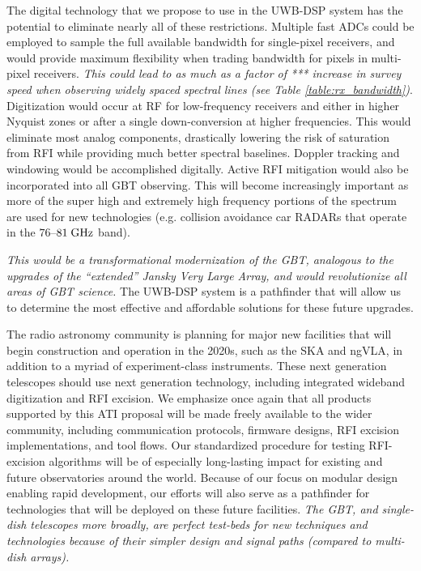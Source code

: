 \documentclass[10pt]{myNSF}
\begin{document}
The digital technology that we propose to use in the UWB-DSP system
has the potential to eliminate nearly all of these restrictions.
Multiple fast ADCs could be employed to sample the full available
bandwidth for single-pixel receivers, and would provide maximum
flexibility when trading bandwidth for pixels in multi-pixel
receivers.  \emph{This could lead to as much as a factor of ***
  increase in survey speed when observing widely spaced spectral lines
  (see Table \ref{table:rx_bandwidth})}.  Digitization would occur at
RF for low-frequency receivers and either in higher Nyquist zones or
after a single down-conversion at higher frequencies.  This would
eliminate most analog components, drastically lowering the risk of
saturation from RFI while providing much better spectral baselines.
Doppler tracking and windowing would be accomplished digitally.
Active RFI mitigation would also be incorporated into all GBT
observing.  This will become increasingly important as more of the
super high and extremely high frequency portions of the spectrum are
used for new technologies (e.g. collision avoidance car RADARs that
operate in the $76$--$81\; \textrm{GHz}$ band).

\emph{This would be a transformational modernization of
  the GBT, analogous to the upgrades of the ``extended'' Jansky Very
  Large Array, and would revolutionize all areas of GBT science.}  The
UWB-DSP system is a pathfinder that will allow us to determine the
most effective and affordable solutions for these future upgrades.


The radio astronomy community is planning for major new facilities
that will begin construction and operation in the 2020s, such as the
SKA and ngVLA, in addition to a myriad of experiment-class
instruments.  These next generation telescopes should use next
generation technology, including integrated wideband digitization and
RFI excision.  We emphasize once again that all products supported by
this ATI proposal will be made freely available to the wider
community, including communication protocols, firmware designs, RFI
excision implementations, and tool flows.  Our standardized procedure
for testing RFI-excision algorithms will be of especially long-lasting
impact for existing and future observatories around the world.
Because of our focus on modular design enabling rapid development, our
efforts will also serve as a pathfinder for technologies that will be
deployed on these future facilities.  \emph{The GBT, and single-dish
  telescopes more broadly, are perfect test-beds for new techniques
  and technologies because of their simpler design and signal paths
  (compared to multi-dish arrays).}
\end{document}
